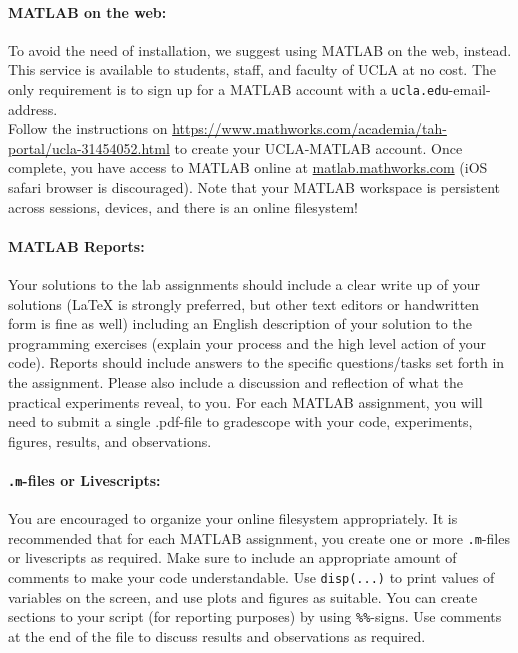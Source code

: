 \documentclass[11pt,letter]{article}
\begin{document}
\paragraph{MATLAB on the web:}
To avoid the need of installation, we suggest using MATLAB on the web, instead. This service is available to students, staff, and faculty of UCLA at no cost. The only requirement is to sign up for a MATLAB account with a \texttt{ucla.edu}-email-address.\\

Follow the instructions on \url{https://www.mathworks.com/academia/tah-portal/ucla-31454052.html} to create your UCLA-MATLAB account. Once complete, you have access to MATLAB online at \url{matlab.mathworks.com} (iOS safari browser is discouraged).
Note that your MATLAB workspace is persistent across sessions, devices, and there is an online filesystem!

\paragraph{MATLAB Reports:}
Your solutions to the lab assignments should include a clear write up of your solutions (LaTeX is strongly
preferred, but other text editors or handwritten form is fine as well) including an English description of your solution to the programming exercises (explain your process
and the high level action of your code). Reports should include answers to the specific questions/tasks set forth in the assignment. Please also include a discussion and reflection of what the practical experiments reveal, to you. For each MATLAB assignment, you will need to submit a single .pdf-file to gradescope with your code, experiments, figures, results, and observations.

\paragraph{\texttt{.m}-files or Livescripts:}
You are encouraged to organize your online filesystem appropriately. It is recommended that for each MATLAB assignment, you create one or more \texttt{.m}-files or livescripts as required. Make sure to include an appropriate amount of comments to make your code understandable. Use \texttt{disp(...)} to print values of variables on the screen, and use plots and figures as suitable. You can create sections to your script (for reporting purposes) by using \texttt{\%\%}-signs. Use comments at the end of the file to discuss results and observations as required. 
\end{document}
